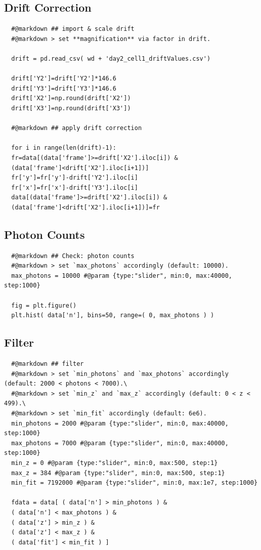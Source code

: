 \documentclass[11pt, a4paper, oneside, twocolumn]{report}
\begin{document}
\subsection{Drift Correction}

\begin{verbatim}
  #@markdown ## import & scale drift
  #@markdown > set **magnification** via factor in drift.

  drift = pd.read_csv( wd + 'day2_cell1_driftValues.csv')

  drift['Y2']=drift['Y2']*146.6
  drift['Y3']=drift['Y3']*146.6
  drift['X2']=np.round(drift['X2'])
  drift['X3']=np.round(drift['X3'])

  #@markdown ## apply drift correction

  for i in range(len(drift)-1):
  fr=data[(data['frame']>=drift['X2'].iloc[i]) &
  (data['frame']<drift['X2'].iloc[i+1])]
  fr['y']=fr['y']-drift['Y2'].iloc[i]
  fr['x']=fr['x']-drift['Y3'].iloc[i]
  data[(data['frame']>=drift['X2'].iloc[i]) &
  (data['frame']<drift['X2'].iloc[i+1])]=fr
\end{verbatim}


\subsection{Photon Counts}

\begin{verbatim}
  #@markdown ## Check: photon counts
  #@markdown > set `max_photons` accordingly (default: 10000).
  max_photons = 10000 #@param {type:"slider", min:0, max:40000, step:1000}
  
  fig = plt.figure()
  plt.hist( data['n'], bins=50, range=( 0, max_photons ) )
\end{verbatim}


\subsection{Filter}

\begin{verbatim}
  #@markdown ## filter
  #@markdown > set `min_photons` and `max_photons` accordingly (default: 2000 < photons < 7000).\
  #@markdown > set `min_z` and `max_z` accordingly (default: 0 < z < 499).\
  #@markdown > set `min_fit` accordingly (default: 6e6).
  min_photons = 2000 #@param {type:"slider", min:0, max:40000, step:1000}
  max_photons = 7000 #@param {type:"slider", min:0, max:40000, step:1000}
  min_z = 0 #@param {type:"slider", min:0, max:500, step:1}
  max_z = 384 #@param {type:"slider", min:0, max:500, step:1}
  min_fit = 7192000 #@param {type:"slider", min:0, max:1e7, step:1000}
  
  fdata = data[ ( data['n'] > min_photons ) &
  ( data['n'] < max_photons ) & 
  ( data['z'] > min_z ) &
  ( data['z'] < max_z ) &
  ( data['fit'] < min_fit ) ]
\end{verbatim}
\end{document}
